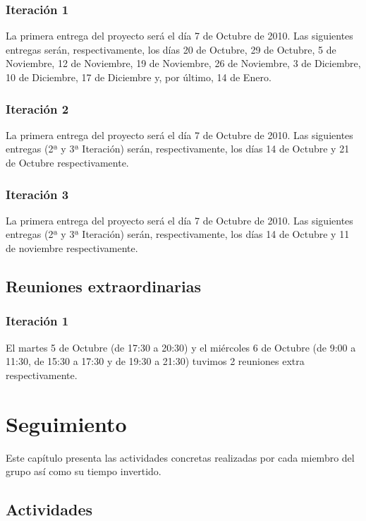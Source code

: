 \documentclass[11 pt]{book}
\begin{document}
        \subsection*{Iteración 1}
            La primera entrega del proyecto será el día 7 de Octubre de 2010. Las siguientes entregas serán, respectivamente, los días 20 de Octubre, 29 de Octubre, 5 de Noviembre, 12 de Noviembre, 19 de Noviembre, 26 de Noviembre, 3 de Diciembre, 10 de Diciembre, 17 de Diciembre y, por último, 14 de Enero.
            
        \subsection*{Iteración 2}
            La primera entrega del proyecto será el día 7 de Octubre de 2010. Las siguientes entregas (2ª y 3ª Iteración) serán, respectivamente, los días 14 de Octubre y 21 de Octubre respectivamente.
            
        \subsection*{Iteración 3}
	        La primera entrega del proyecto será el día 7 de Octubre de 2010. Las siguientes entregas (2ª y 3ª Iteración) serán, respectivamente, los días 14 de Octubre y 11 de noviembre respectivamente.

	\section{Reuniones extraordinarias}
	    \subsection*{Iteración 1}
		    El martes 5 de Octubre (de 17:30 a 20:30) y el miércoles 6 de Octubre (de 9:00 a 11:30, de 15:30 a 17:30 y de 19:30 a 21:30) tuvimos 2 reuniones extra respectivamente.

\chapter{Seguimiento}
	Este capítulo presenta las actividades concretas realizadas por cada miembro del grupo así como su tiempo invertido.
	
	\section{Actividades}
\end{document}
